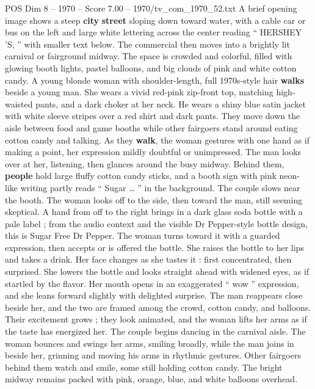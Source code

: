 \begin{textsample}{POS Dim 8 – 1970 – Score 7.00 – 1970/tv\_com\_1970\_52.txt}  \label{ex:f8_pos_034}
A brief opening image shows a steep \textbf{city} \textbf{street} sloping down toward water, with a cable car or bus on the left and large white lettering across the center reading “ HERSHEY ’S, ” with smaller text below.
The commercial then moves into a brightly lit carnival or fairground midway.
The space is crowded and colorful, filled with glowing booth lights, pastel balloons, and big clouds of pink and white cotton candy.
A young blonde woman with shoulder-length, full 1970s-style hair \textbf{walks} beside a young man.
She wears a vivid red-pink zip-front top, matching high-waisted pants, and a dark choker at her neck.
He wears a shiny blue satin jacket with white sleeve stripes over a red shirt and dark pants.
They move down the aisle between food and game booths while other fairgoers stand around eating cotton candy and talking.
As they \textbf{walk}, the woman gestures with one hand as if making a point, her expression mildly doubtful or unimpressed.
The man looks over at her, listening, then glances around the busy midway.
Behind them, \textbf{people} hold large fluffy cotton candy sticks, and a booth sign with pink neon-like writing partly reads “ Sugar … ” in the background.
The couple slows near the booth.
The woman looks off to the side, then toward the man, still seeming skeptical.
A hand from off to the right brings in a dark glass soda bottle with a pale label ; from the audio context and the visible Dr Pepper-style bottle design, this is Sugar Free Dr Pepper.
The woman turns toward it with a guarded expression, then accepts or is offered the bottle.
She raises the bottle to her lips and takes a drink.
Her face changes as she tastes it : first concentrated, then surprised.
She lowers the bottle and looks straight ahead with widened eyes, as if startled by the flavor.
Her mouth opens in an exaggerated “ wow ” expression, and she leans forward slightly with delighted surprise.
The man reappears close beside her, and the two are framed among the crowd, cotton candy, and balloons.
Their excitement grows ; they look animated, and the woman lifts her arms as if the taste has energized her.
The couple begins dancing in the carnival aisle.
The woman bounces and swings her arms, smiling broadly, while the man joins in beside her, grinning and moving his arms in rhythmic gestures.
Other fairgoers behind them watch and smile, some still holding cotton candy.
The bright midway remains packed with pink, orange, blue, and white balloons overhead.

\end{textsample}
